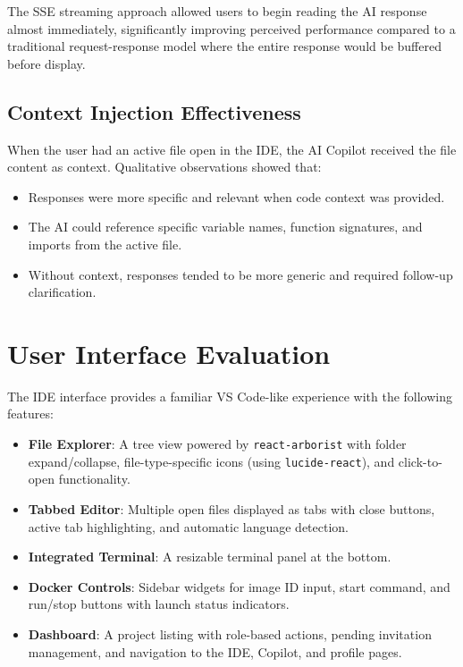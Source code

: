 \documentclass[12pt,a4paper,oneside]{report}
\begin{document}
The SSE streaming approach allowed users to begin reading the AI response almost immediately, significantly improving perceived performance compared to a traditional request-response model where the entire response would be buffered before display.

\subsection{Context Injection Effectiveness}

When the user had an active file open in the IDE, the AI Copilot received the file content as context. Qualitative observations showed that:

\begin{itemize}
    \item Responses were more specific and relevant when code context was provided.
    \item The AI could reference specific variable names, function signatures, and imports from the active file.
    \item Without context, responses tended to be more generic and required follow-up clarification.
\end{itemize}

\section{User Interface Evaluation}

The IDE interface provides a familiar VS Code-like experience with the following features:

\begin{itemize}
    \item \textbf{File Explorer}: A tree view powered by \texttt{react-arborist} with folder expand/collapse, file-type-specific icons (using \texttt{lucide-react}), and click-to-open functionality.
    \item \textbf{Tabbed Editor}: Multiple open files displayed as tabs with close buttons, active tab highlighting, and automatic language detection.
    \item \textbf{Integrated Terminal}: A resizable terminal panel at the bottom.
    \item \textbf{Docker Controls}: Sidebar widgets for image ID input, start command, and run/stop buttons with launch status indicators.
    \item \textbf{Dashboard}: A project listing with role-based actions, pending invitation management, and navigation to the IDE, Copilot, and profile pages.
\end{itemize}
\end{document}

